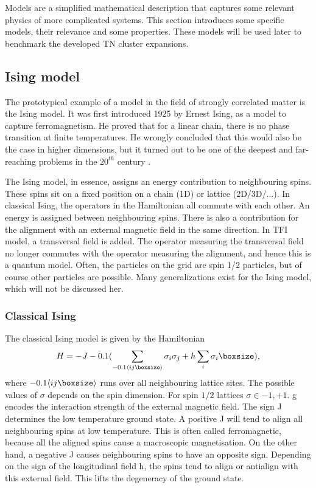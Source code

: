 Models are a simplified mathematical description that captures some relevant physics of more complicated systems. This section introduces some specific models, their relevance and some properties. These models will be used later to benchmark the developed \Gls{TN} cluster expansions.

\subsection{Ising model}\label{models:ising}

The prototypical example of a model in the field of strongly correlated matter is the Ising model. It was first introduced 1925 by Ernest Ising, as a model to capture ferromagnetism. He proved that for a linear chain, there is no phase transition at finite temperatures. He wrongly concluded that this would also be the case in higher dimensions, but it turned out to be one of the deepest and far-reaching problems in the $20^{th}$ century \cite{Taroni2015}.

The Ising model, in essence, assigns an energy contribution to neighbouring spins. These spins sit on a fixed position on a chain (1D) or lattice (2D/3D/...). In classical Ising, the operators in the Hamiltonian all commute with each other. An energy is assigned between neighbouring spins. There is also a contribution for the alignment with an external magnetic field in the same direction. In \Gls{TFI} model, a transversal field is added. The operator measuring the transversal field no longer commutes with the operator measuring the alignment, and hence this is a quantum model. Often, the particles on the grid are spin 1/2 particles, but of course other particles are possible. Many generalizations exist for the Ising model, which will not be discussed her.

\subsubsection{Classical Ising}

The classical Ising model is given by the Hamiltonian
\begin{equation}
  H = -J \left (  \sum_{\Braket{i j }} \sigma_i \sigma_j + h \sum_i \sigma_i \right ),
\end{equation}
where $  \Braket{i j }$ runs over all neighbouring lattice sites. The possible values of $\sigma$ depends on the spin dimension. For spin $1/2$ lattices $\sigma \in {-1,+1}$. g encodes the interaction strength of the external magnetic field. The sign J determines the low temperature ground state. A positive J will tend to align all neighbouring spins at low temperature. This is often called ferromagnetic, because all the aligned spins cause a macroscopic magnetisation. On the other hand, a negative J causes neighbouring spins to have an opposite sign. Depending on the sign of the longitudinal field h, the spins tend to align or antialign with this external field. This lifts the degeneracy of the ground state.

